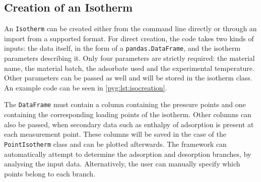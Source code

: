 \subsection{Creation of an Isotherm}

An \texttt{Isotherm} can be created either from the command line 
directly or through an import from a supported format. For direct
creation, the code takes
two kinds of inputs: the data itself, in the form of a 
\texttt{pandas.DataFrame}, and the isotherm parameters describing it.
Only four parameters are strictly required:
the material name, the material batch, the adsorbate used and the 
experimental temperature. Other parameters can be passed as well 
and will be stored in the isotherm class. An example code can 
be seen in \autoref{pyg:lst:isocreation}.

The \texttt{DataFrame} must contain a column containing the pressure
points and one containing the corresponding loading points of the 
isotherm. Other columns can also be passed, when
secondary data such as enthalpy of adsorption is present at 
each measurement point. These columns will be saved in the case of
the \texttt{PointIsotherm} class and can be
plotted afterwards. The framework can automatically attempt to 
determine the adsorption and desorption branches, by analysing the
input data. Alternatively, the user can manually specify which
points belong to each branch.

